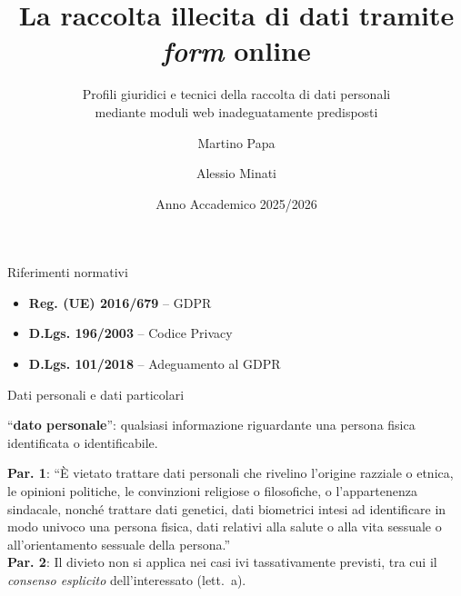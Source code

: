\documentclass[aspectratio=169]{beamer}
\title{La raccolta illecita di dati tramite \emph{form} online}
\subtitle{Profili giuridici e tecnici della raccolta di dati personali\\mediante moduli web inadeguatamente predisposti}
\author{Martino Papa \and Alessio Minati}
\institute{Università degli Studi di Firenze\\Corso di Informatica Forense}
\date{Anno Accademico 2025/2026}
\begin{document}
\begin{frame}
  \titlepage
\end{frame}

\begin{frame}{Riferimenti normativi}
  \Large
  \vspace{0.5cm}
  \begin{itemize}
    \setlength\itemsep{1.2em}
    \item \textbf{Reg. (UE) 2016/679} -- GDPR
    \item \textbf{D.Lgs. 196/2003} -- Codice Privacy
    \item \textbf{D.Lgs. 101/2018} -- Adeguamento al GDPR
  \end{itemize}
\end{frame}

\begin{frame}{Dati personali e dati particolari}

  \begin{normabox}
    \small
    ``\textbf{dato personale}'': qualsiasi informazione riguardante una persona fisica identificata o identificabile.
  \end{normabox}

  \vspace{0.3cm}

  \begin{normabox}
    \small
    \textbf{Par. 1}: ``È vietato trattare dati personali che rivelino l'origine
    razziale o etnica, le opinioni politiche, le convinzioni religiose o filosofiche,
    o l'appartenenza sindacale, nonché trattare dati genetici, dati biometrici intesi
    ad identificare in modo univoco una persona fisica, dati relativi alla salute o
    alla vita sessuale o all'orientamento sessuale della persona.''\\[0.3em]
    \textbf{Par. 2}: Il divieto non si applica nei casi ivi tassativamente previsti,
    tra cui il \emph{consenso esplicito} dell'interessato (lett.~a).
  \end{normabox}

\end{frame}
\end{document}
